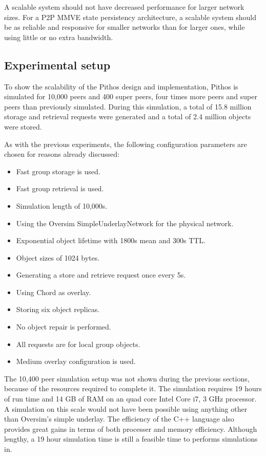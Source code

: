 A scalable system should not have decreased performance for larger network sizes. For a P2P MMVE state persistency architecture, a scalable system should be as reliable and responsive for smaller networks than for larger ones, while using little or no extra bandwidth.

\subsection{Experimental setup}

To show the scalability of the Pithos design and implementation, Pithos is simulated for 10,000 peers and 400 super peers, four times more peers and super peers than previously simulated. During this simulation, a total of 15.8 million storage and retrieval requests were generated and a total of 2.4 million objects were stored.

As with the previous experiments, the following configuration parameters are chosen for reasons already discussed:
%
\begin{itemize}
\item Fast group storage is used.
\item Fast group retrieval is used.
\item Simulation length of 10,000s.
\item Using the Oversim SimpleUnderlayNetwork for the physical network.
\item Exponential object lifetime with 1800s mean and 300s TTL.
\item Object sizes of 1024 bytes.
\item Generating a store and retrieve request once every 5s.
\item Using Chord as overlay.
\item Storing six object replicas.
\item No object repair is performed.
\item All requests are for local group objects.
\item Medium overlay configuration is used.
\end{itemize}


The 10,400 peer simulation setup was not shown during the previous sections, because of the resources required to complete it. The simulation requires 19 hours of run time and 14 GB of RAM on an quad core Intel Core i7, 3 GHz processor. A simulation on this scale would not have been possible using anything other than Oversim's simple underlay. The efficiency of the C++ language also provides great gains in terms of both processer and memory efficiency. Although lengthy, a 19 hour simulation time is still a feasible time to performs simulations in.


